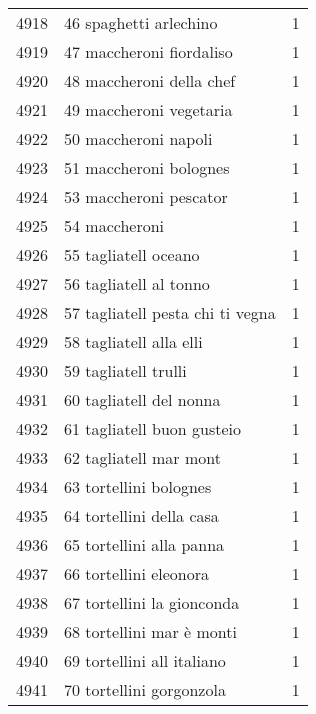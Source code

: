 \begin{tabular}{llr}
4918 &                             46 spaghetti arlechino &      1 \\
4919 &                           47 maccheroni fiordaliso &      1 \\
4920 &                           48 maccheroni della chef &      1 \\
4921 &                            49 maccheroni vegetaria &      1 \\
4922 &                               50 maccheroni napoli &      1 \\
4923 &                             51 maccheroni bolognes &      1 \\
4924 &                             53 maccheroni pescator &      1 \\
4925 &                                      54 maccheroni &      1 \\
4926 &                               55 tagliatell oceano &      1 \\
4927 &                             56 tagliatell al tonno &      1 \\
4928 &                   57 tagliatell pesta chi ti vegna &      1 \\
4929 &                            58 tagliatell alla elli &      1 \\
4930 &                               59 tagliatell trulli &      1 \\
4931 &                            60 tagliatell del nonna &      1 \\
4932 &                         61 tagliatell buon gusteio &      1 \\
4933 &                             62 tagliatell mar mont &      1 \\
4934 &                             63 tortellini bolognes &      1 \\
4935 &                           64 tortellini della casa &      1 \\
4936 &                           65 tortellini alla panna &      1 \\
4937 &                             66 tortellini eleonora &      1 \\
4938 &                         67 tortellini la gionconda &      1 \\
4939 &                          68 tortellini mar è monti &      1 \\
4940 &                         69 tortellini all italiano &      1 \\
4941 &                           70 tortellini gorgonzola &      1 \\

\end{tabular}
